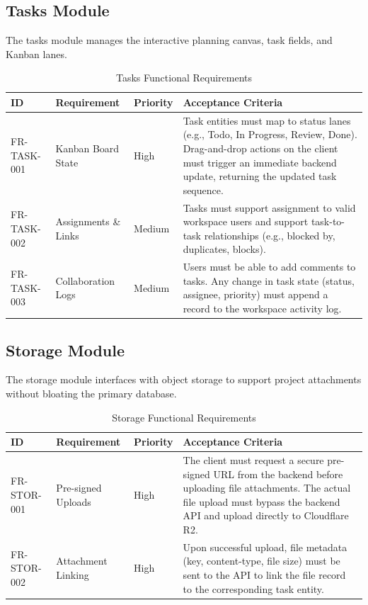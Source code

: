 \pagebreak
\subsection{Tasks Module}
The tasks module manages the interactive planning canvas, task fields, and Kanban lanes.

\begin{table}[h!]
\centering
\small
\renewcommand{\arraystretch}{1.5}
\begin{tabularx}{\textwidth}{l p{2.2cm} l X}
    \toprule[1.5pt]
    \rowcolor{primary!5}
    \textbf{\color{primary}ID} & \textbf{\color{primary}Requirement} & \textbf{\color{primary}Priority} & \textbf{\color{primary}Acceptance Criteria} \\
    \midrule
    FR-TASK-001 & Kanban Board State & High & Task entities must map to status lanes (e.g., Todo, In Progress, Review, Done). Drag-and-drop actions on the client must trigger an immediate backend update, returning the updated task sequence. \\
    FR-TASK-002 & Assignments \& Links & Medium & Tasks must support assignment to valid workspace users and support task-to-task relationships (e.g., blocked by, duplicates, blocks). \\
    FR-TASK-003 & Collaboration Logs & Medium & Users must be able to add comments to tasks. Any change in task state (status, assignee, priority) must append a record to the workspace activity log. \\
    \bottomrule[1.5pt]
\end{tabularx}
\caption{Tasks Functional Requirements}
\label{tab:fr_task}
\end{table}

\subsection{Storage Module}
The storage module interfaces with object storage to support project attachments without bloating the primary database.

\begin{table}[h!]
\centering
\small
\renewcommand{\arraystretch}{1.5}
\begin{tabularx}{\textwidth}{l p{2.2cm} l X}
    \toprule[1.5pt]
    \rowcolor{primary!5}
    \textbf{\color{primary}ID} & \textbf{\color{primary}Requirement} & \textbf{\color{primary}Priority} & \textbf{\color{primary}Acceptance Criteria} \\
    \midrule
    FR-STOR-001 & Pre-signed Uploads & High & The client must request a secure pre-signed URL from the backend before uploading file attachments. The actual file upload must bypass the backend API and upload directly to Cloudflare R2. \\
    FR-STOR-002 & Attachment Linking & High & Upon successful upload, file metadata (key, content-type, file size) must be sent to the API to link the file record to the corresponding task entity. \\
    \bottomrule[1.5pt]
\end{tabularx}
\caption{Storage Functional Requirements}
\label{tab:fr_stor}
\end{table}

